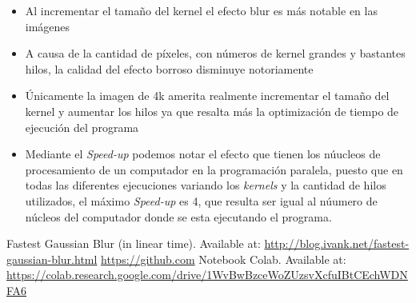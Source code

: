 \documentclass[a4paper,10pt]{IEEEtran}
\begin{document}
\begin{itemize}
    \item Al incrementar el tamaño del kernel el efecto blur es más notable en las im\'agenes 
    \item A causa de la cantidad de píxeles, con n\'umeros de kernel grandes y bastantes hilos, la calidad del efecto borroso disminuye notoriamente
    \item \'Unicamente la imagen de 4k amerita realmente incrementar el tama\~no del kernel y aumentar los hilos ya que resalta m\'as la optimizaci\'on de tiempo de ejecuci\'on del programa
    \item Mediante el \textit{Speed-up} podemos notar el efecto que tienen los n\'uucleos de procesamiento de un computador en la programaci\'on paralela, puesto que en todas las diferentes ejecuciones variando los \textit{kernels} y la cantidad de hilos utilizados, el m\'aximo \textit{Speed-up} es 4, que resulta ser igual al n\'uumero de n\'ucleos del computador donde se esta ejecutando el programa. 
\end{itemize}{}


\begin{thebibliography}{50}
\scriptsize{

 Fastest Gaussian Blur (in linear time). Available at:
\url{http://blog.ivank.net/fastest-gaussian-blur.html} \url{https://github.com}
 Notebook Colab. Available at:
\url{https://colab.research.google.com/drive/1WvBwBzceWoZUzsvXcfuIBtCEchWDNFA6}

}
\end{thebibliography}{}
\end{document}
